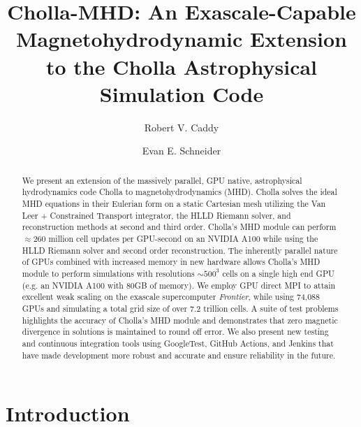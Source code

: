 \documentclass[modern, linenumbers]{aastex631}
\begin{document}
\title{Cholla-MHD: An Exascale-Capable Magnetohydrodynamic Extension to the Cholla Astrophysical Simulation Code}

\author[0000-0002-4475-3181]{Robert V. Caddy}

\author[0000-0001-9735-7484]{Evan E. Schneider}

\begin{abstract}

    We present an extension of the massively parallel, GPU native, astrophysical hydrodynamics code Cholla to magnetohydrodynamics (MHD).
    Cholla solves the ideal MHD equations in their Eulerian form on a static Cartesian mesh utilizing the Van Leer + Constrained Transport integrator, the HLLD Riemann solver, and reconstruction methods at second and third order.
    Cholla's MHD module can perform $\approx260$ million cell updates per GPU-second on an NVIDIA A100 while using the HLLD Riemann solver and second order reconstruction.
    The inherently parallel nature of GPUs combined with increased memory in new hardware allows Cholla's MHD module to perform simulations with resolutions $\sim500^3$ cells on a single high end GPU (e.g. an NVIDIA A100 with 80GB of memory).
    We employ GPU direct MPI to attain excellent weak scaling on the exascale supercomputer \textit{Frontier}, while using 74,088 GPUs and simulating a total grid size of over 7.2 trillion cells.
    A suite of test problems highlights the accuracy of Cholla's MHD module and demonstrates that zero magnetic divergence in solutions is maintained to round off error.
    We also present new testing and continuous integration tools using GoogleTest, GitHub Actions, and Jenkins that have made development more robust and accurate and ensure reliability in the future.

    \end{abstract}


\section{Introduction}
\label{sec:intro}
\end{document}
